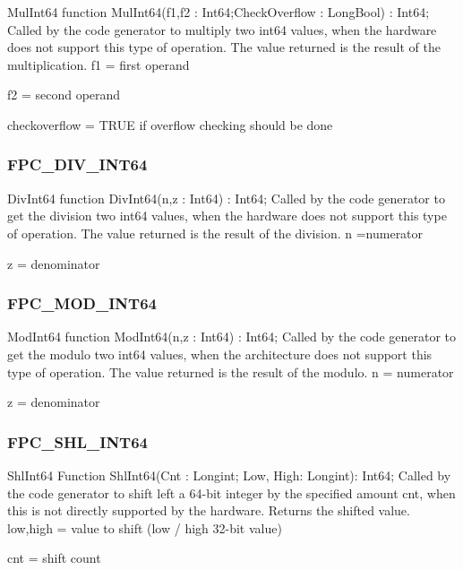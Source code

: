 \documentclass [12pt]{article}
\begin{document}
\begin{function}{MulInt64}
\Declaration
function MulInt64(f1,f2 : Int64;CheckOverflow : LongBool) : Int64;
\Description 
Called by the code generator to multiply two int64 values, when the hardware
does not support this type of operation. The value returned is the result of
the multiplication.
\Parameters 
f1 = first operand \par
f2 = second operand \par
checkoverflow = TRUE if overflow checking should be done 
\end{function}

\subsubsection{FPC{\_}DIV{\_}INT64}
\label{subsubsec:mylabel99}

\begin{function}{DivInt64}
\Declaration
function DivInt64(n,z : Int64) : Int64;
\Description 
Called by the code generator to get the division two int64 values, when the
hardware does not support this type of operation. The value returned is the
result of the division.
\Parameters 
n =numerator \par
z = denominator 
\end{function}

\subsubsection{FPC{\_}MOD{\_}INT64}
\label{subsubsec:mylabel100}

\begin{function}{ModInt64}
\Declaration
function ModInt64(n,z : Int64) : Int64;
\Description 
Called by the code generator to get the modulo two int64 values, when the
architecture does not support this type of operation. The value returned is
the result of the modulo.
\Parameters 
n = numerator \par 
z = denominator 
\end{function}

\subsubsection{FPC{\_}SHL{\_}INT64}
\label{subsubsec:mylabel101}

\begin{function}{ShlInt64}
\Declaration
Function ShlInt64(Cnt : Longint; Low, High: Longint): Int64;
\Description 
Called by the code generator to shift left a 64-bit integer by the specified
amount cnt, when this is not directly supported by the hardware. Returns the
shifted value.
\Parameters 
low,high = value to shift (low / high 32-bit value) \par
cnt = shift count 
\end{function}
\end{document}

